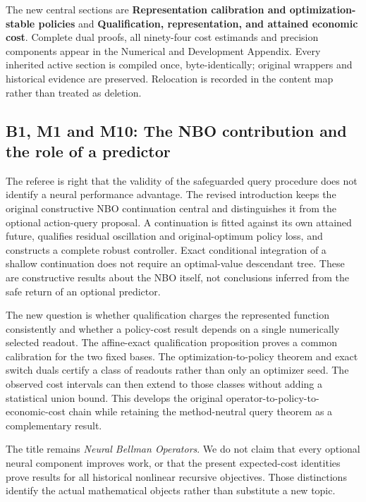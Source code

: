 \documentclass[ecta,nameyear,draft]{econsocart}
\begin{document}
The new central sections are \textbf{Representation calibration and
optimization-stable policies} and \textbf{Qualification, representation,
and attained economic cost}. Complete dual proofs, all ninety-four cost
estimands and precision components appear in the Numerical and
Development Appendix. Every inherited active section is compiled once,
byte-identically; original wrappers and historical evidence are
preserved. Relocation is recorded in the content map rather than treated
as deletion.

\hypertarget{b1-m1-and-m10-the-nbo-contribution-and-the-role-of-a-predictor}{%
\subsection{B1, M1 and M10: The NBO contribution and the role of a
predictor}\label{b1-m1-and-m10-the-nbo-contribution-and-the-role-of-a-predictor}}

The referee is right that the validity of the safeguarded query
procedure does not identify a neural performance advantage. The revised
introduction keeps the original constructive NBO continuation central
and distinguishes it from the optional action-query proposal. A
continuation is fitted against its own attained future, qualifies
residual oscillation and original-optimum policy loss, and constructs a
complete robust controller. Exact conditional integration of a shallow
continuation does not require an optimal-value descendant tree. These
are constructive results about the NBO itself, not conclusions inferred
from the safe return of an optional predictor.

The new question is whether qualification charges the represented
function consistently and whether a policy-cost result depends on a
single numerically selected readout. The affine-exact qualification
proposition proves a common calibration for the two fixed bases. The
optimization-to-policy theorem and exact switch duals certify a class of
readouts rather than only an optimizer seed. The observed cost intervals
can then extend to those classes without adding a statistical union
bound. This develops the original operator-to-policy-to-economic-cost
chain while retaining the method-neutral query theorem as a
complementary result.

The title remains \emph{Neural Bellman Operators}. We do not claim that
every optional neural component improves work, or that the present
expected-cost identities prove results for all historical nonlinear
recursive objectives. Those distinctions identify the actual
mathematical objects rather than substitute a new topic.
\end{document}
